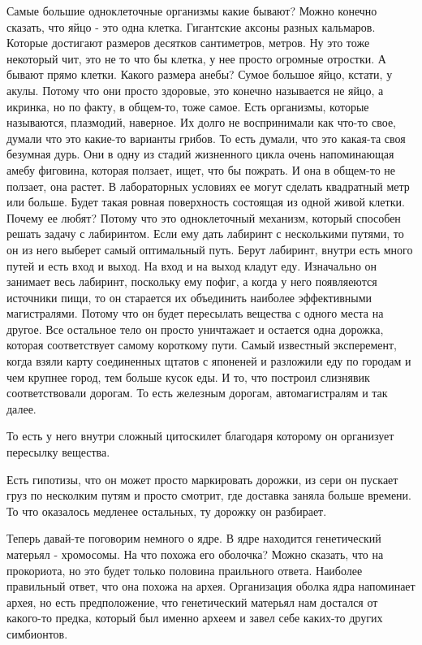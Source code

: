 Самые большие одноклеточные организмы какие бывают? 
Можно конечно сказать, что яйцо - это 
одна клетка. Гигантские аксоны разных 
кальмаров. Которые достигают размеров десятков 
сантиметров, метров. Ну это тоже некоторый чит, 
это не то что бы клетка, у нее просто огромные отростки. 
А бывают прямо клетки. Какого размера анебы? Сумое
большое яйцо, кстати, у акулы. Потому что они просто
здоровые, это конечно называется не яйцо,
а икринка, но по факту, в общем-то, тоже самое.
Есть организмы, которые называются, плазмодий, наверное.
Их долго не воспринимали как что-то свое, думали что
это какие-то варианты грибов. То есть думали, что
это какая-та своя безумная дурь. Они в одну из
стадий жизненного цикла очень напоминающая амебу фиговина,
которая ползает, ищет, что бы пожрать. И она в общем-то
не ползает, она растет. В лабораторных условиях
ее могут сделать квадратный метр или больше. Будет такая
ровная поверхность состоящая из одной живой клетки.
Почему ее любят? Потому что это одноклеточный механизм,
который способен решать задачу с лабиринтом. Если
ему дать лабиринт с несколькими путями, то
он из него выберет самый оптимальный путь.
Берут лабиринт, внутри есть много путей и есть
вход и выход. На вход и на выход кладут еду.
Изначально он занимает весь лабиринт, поскольку
ему пофиг, а когда у него
появляеются источники пищи, то он старается их объединить
наиболее эффективными магистралями. Потому что он будет пересылать
вещества с одного места на другое. Все остальное тело он
просто уничтажает и остается одна
дорожка, которая соответствует самому короткому пути.
Самый известный эксперемент, когда взяли карту соединенных 
щтатов с японеней и разложили еду по городам и чем крупнее 
город, тем больше кусок еды. И то, что построил слизнявик 
соответствовали дорогам. То есть железным дорогам, 
автомагистралям и так далее. 

То есть у него внутри сложный цитоскилет благодаря которому 
он организует пересылку вещества. 

Есть гипотизы, что он может просто маркировать дорожки, из 
сери он пускает груз по несколким путям и просто смотрит, 
где доставка заняла больше времени. То что оказалось медленее остальных, 
ту дорожку он разбирает. 

Теперь давай-те поговорим немного о ядре. В ядре находится 
генетический матерьял - хромосомы. На что 
похожа его оболочка? Можно сказать, что 
на прокориота, но это будет только 
половина праильного ответа. Наиболее правильный ответ, 
что она похожа на архея. Организация оболка ядра напоминает 
архея, но есть предположение, 
что генетический матерьял нам достался от какого-то предка, 
который был именно археем и завел себе каких-то других симбионтов. 

